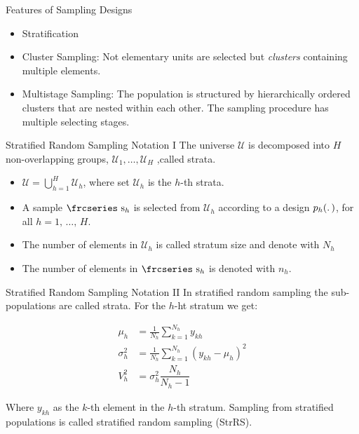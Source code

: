 \documentclass[10pt]{beamer}\usepackage[]{graphicx}\usepackage[]{color}
\newcommand{\eqname}[1]{\tag*{#1}} %
\newcommand{\textfrc}[1]{{\frcseries#1}}
\newcommand{\mathfrc}[1]{\text{\textfrc{#1}}}
\begin{document}
\begin{frame}{Features of Sampling Designs}
\begin{itemize}
\item Stratification
\item Cluster Sampling: Not elementary units are selected but \emph{clusters} containing multiple elements. 
\item Multistage Sampling: The population is structured by hierarchically ordered clusters that are nested within each other. The sampling procedure has multiple selecting stages. 
\end{itemize}
\end{frame}


\begin{frame}{Stratified Random Sampling Notation I}
  The universe $\mathcal{U}$ is decomposed into $H$ non-overlapping groups,
  $\mathcal{U}_1,\dots,\mathcal{U}_H$ ,called strata.
  \begin{itemize}
  	\item $\mathcal{U} = \bigcup\limits_{h=1}^H \mathcal{U}_h$, where set $\mathcal{U}_h$ is
  the $h$-th
  strata. 
  	\item A sample $\mathfrc{s}_{h}$ is selected from $\mathcal{U}_h$ according to a design
  $p_h(\ldotp)$, for all $h=1,\,\ldots,\,H$. 
  	\item The number of elements in $\mathcal{U}_h$ is called stratum size and denote
  with $N_h$
  	\item The number of elements in $\mathfrc{s}_{h}$ is denoted with $n_h$.
  \end{itemize}
\end{frame}

\begin{frame}{Stratified Random Sampling Notation II}
  In stratified random sampling the sub-populations are called strata. For the  $h$-ht stratum
  we get:
  
  \begin{align}
  \mu_{h}      &= \frac{1}{N_h} \sum^{N_h}_{k=1} y_{kh} \eqname{mean of stratum h} \\
  \sigma^2_{h} &= \frac{1}{N_h}\sum^{N_h}_{k=1} (y_{kh}-\mu_{h})^2  \eqname{variance of stratum $h$} \\
  V^2_{h} & = \sigma^2_{h} \dfrac{N_h}{N_h-1} \nonumber
  \end{align}
  
  Where  $y_{kh}$ as the $k$-th element in the $h$-th stratum.
  Sampling from stratified populations is called stratified random sampling (StrRS).
  
\end{frame}
\end{document}
